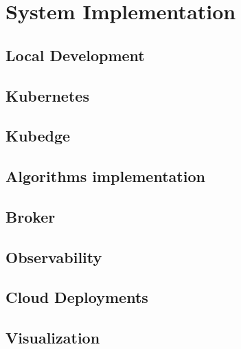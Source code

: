 \chapter{System Implementation}

\section{Local Development}


\section{Kubernetes}


\section{Kubedge}


\section{Algorithms implementation}


\section{Broker}


\section{Observability}


\section{Cloud Deployments}


\section{Visualization}

